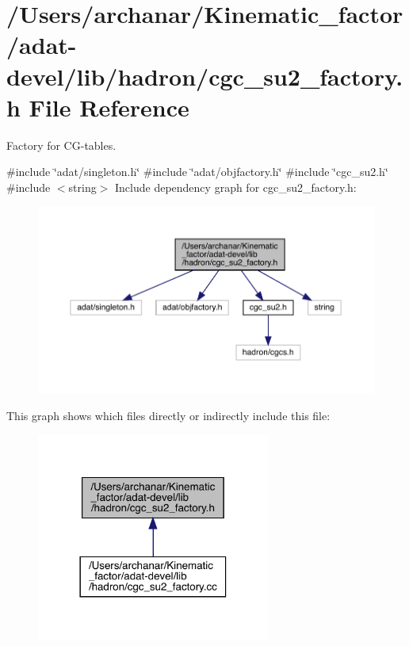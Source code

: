 \hypertarget{adat-devel_2lib_2hadron_2cgc__su2__factory_8h}{}\section{/\+Users/archanar/\+Kinematic\+\_\+factor/adat-\/devel/lib/hadron/cgc\+\_\+su2\+\_\+factory.h File Reference}
\label{adat-devel_2lib_2hadron_2cgc__su2__factory_8h}


Factory for C\+G-\/tables.  


{\ttfamily \#include \char`\"{}adat/singleton.\+h\char`\"{}}\newline
{\ttfamily \#include \char`\"{}adat/objfactory.\+h\char`\"{}}\newline
{\ttfamily \#include \char`\"{}cgc\+\_\+su2.\+h\char`\"{}}\newline
{\ttfamily \#include $<$string$>$}\newline
Include dependency graph for cgc\+\_\+su2\+\_\+factory.\+h\+:
\nopagebreak
\begin{figure}[H]
\begin{center}
\leavevmode
\includegraphics[width=350pt]{df/d0d/adat-devel_2lib_2hadron_2cgc__su2__factory_8h__incl}
\end{center}
\end{figure}
This graph shows which files directly or indirectly include this file\+:
\nopagebreak
\begin{figure}[H]
\begin{center}
\leavevmode
\includegraphics[width=218pt]{d2/d7f/adat-devel_2lib_2hadron_2cgc__su2__factory_8h__dep__incl}
\end{center}
\end{figure}
